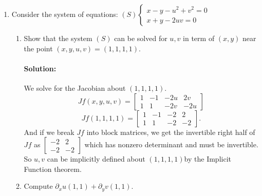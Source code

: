 \documentclass{article}
\begin{document}
\begin{enumerate}
\begin{enumerate}[label= (\alph*)]
\end{enumerate}

\item Consider the system of equations:
$(S) \left\{\begin{array}{l}
x - y - u^2 + v^2 = 0 \\
x + y - 2uv = 0
\end{array}\right.$  
\begin{enumerate}[label= (\alph*)] 
    \item Show that the system $(S)$ can be solved for $u,v$ in term of $(x,y)$ near the point $(x,y,u,v)=(1,1,1,1).$  
        \paragraph{Solution: }We solve for the Jacobian about $(1,1,1,1)$.
         \[ Jf(x,y,u,v)=\begin{bmatrix} 
        1&-1&-2u&2v\\
        1&1&-2v&-2u \end{bmatrix} \]
        \[
        Jf(1,1,1,1)=\begin{bmatrix} 
        1&-1&-2&2\\
        1&1&-2&-2 \end{bmatrix}
        .\] 
        And if we break $Jf$ into block matrices, we get the invertible right half of $Jf$ as $\begin{bmatrix} -2&2\\-2&-2 \end{bmatrix} $ which has nonzero determinant and must be invertible. So $u,v$ can be implicitly defined about $(1,1,1,1)$by the Implicit Function theorem. 
    \item Compute $\partial_x u(1,1)+\partial_y v(1,1)$.


\end{enumerate}
\end{enumerate}
\end{document}
